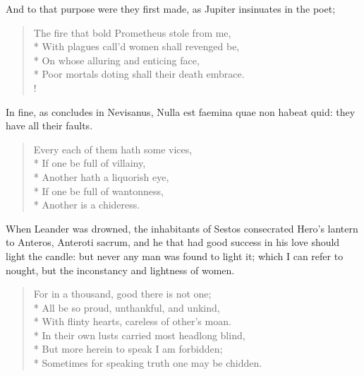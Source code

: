 And to that purpose were they first made, as Jupiter insinuates in the poet;

\begin{verse}
The fire that bold Prometheus stole from me,\\*
With plagues call'd women shall revenged be,\\*
On whose alluring and enticing face,\\*
Poor mortals doting shall their death embrace.\\!
\end{verse}

In fine, as \Diogenes concludes in Nevisanus, Nulla est faemina quae non
habeat quid: they have all their faults.
%
{\gothfont
\begin{verse}
Every each of them hath some vices,\\*
If one be full of villainy,\\*
Another hath a liquorish eye,\\*
If one be full of wantonness,\\*
Another is a chideress.
\end{verse}
}

When Leander was drowned, the inhabitants of Sestos consecrated Hero's
lantern to Anteros, Anteroti sacrum, and he that had good success
in his love should light the candle: but never any man was found to
light it; which I can refer to nought, but the inconstancy and
lightness of women.
%
\begin{verse}
For in a thousand, good there is not one;\\*
All be so proud, unthankful, and unkind,\\*
With flinty hearts, careless of other's moan.\\*
In their own lusts carried most headlong blind,\\*
But more herein to speak I am forbidden;\\*
Sometimes for speaking truth one may be chidden.
\end{verse}
%

